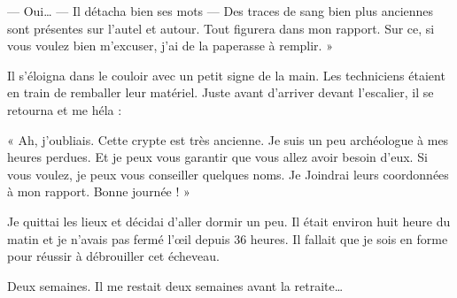 — Oui… — Il détacha bien ses mots — Des traces de sang bien plus anciennes sont présentes sur l'autel et autour. Tout 
figurera dans mon rapport. Sur ce, si vous voulez bien m'excuser, j'ai de la paperasse à remplir. »

Il s'éloigna dans le couloir avec un petit signe de la main. Les techniciens étaient en train de remballer leur 
matériel. Juste avant d'arriver devant l'escalier, il se retourna et me héla :

« Ah, j'oubliais. Cette crypte est très ancienne. Je suis un peu archéologue à mes heures perdues. Et je peux vous 
garantir que vous allez avoir besoin d'eux. Si vous voulez, je peux vous conseiller quelques noms. Je Joindrai leurs 
coordonnées à mon rapport. Bonne journée ! »

Je quittai les lieux et décidai d'aller dormir un peu. Il était environ huit heure du matin et je n'avais pas fermé 
l'œil depuis 36 heures. Il fallait que je sois en forme pour réussir à débrouiller cet écheveau.

Deux semaines. Il me restait deux semaines avant la retraite…
